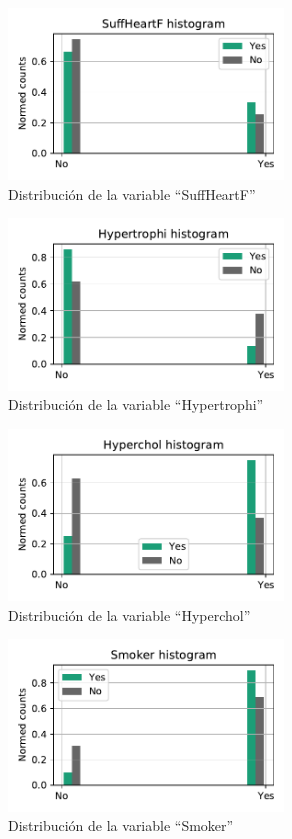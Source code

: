 \documentclass[11pt]{article}
\begin{document}
\begin{figure}[H]
    \centering
    \includegraphics[width = 0.65\textwidth]{2-SuffHeartF-dist.pdf}
    \caption{Distribución de la variable ``SuffHeartF''}
    \label{2-SuffHeartF-dist}
\end{figure}
\begin{figure}[H]
    \centering
    \includegraphics[width = 0.65\textwidth]{2-Hypertrophi-dist.pdf}
    \caption{Distribución de la variable ``Hypertrophi''}
    \label{2-Hypertrophi-dist}
\end{figure}
\begin{figure}[H]
    \centering
    \includegraphics[width = 0.65\textwidth]{2-Hyperchol-dist.pdf}
    \caption{Distribución de la variable ``Hyperchol''}
    \label{2-Hyperchol-dist}
\end{figure}
\begin{figure}[H]
    \centering
    \includegraphics[width = 0.65\textwidth]{2-Smoker-dist.pdf}
    \caption{Distribución de la variable ``Smoker''}
    \label{2-Smoker-dist}
\end{figure}
\end{document}
